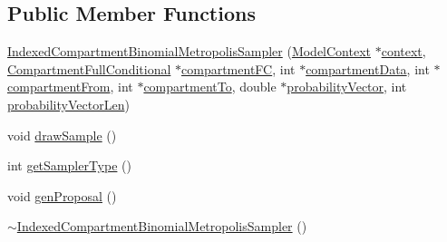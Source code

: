 \subsection*{Public Member Functions}
\begin{DoxyCompactItemize}
\item 
\hyperlink{classSpatialSEIR_1_1IndexedCompartmentBinomialMetropolisSampler_ae6a8ff175ccc0a96d935b40dae644f76}{Indexed\-Compartment\-Binomial\-Metropolis\-Sampler} (\hyperlink{classSpatialSEIR_1_1ModelContext}{Model\-Context} $\ast$\hyperlink{classSpatialSEIR_1_1IndexedCompartmentBinomialMetropolisSampler_afcc687d3efa75c24937e4bc809928268}{context}, \hyperlink{classSpatialSEIR_1_1CompartmentFullConditional}{Compartment\-Full\-Conditional} $\ast$\hyperlink{classSpatialSEIR_1_1IndexedCompartmentBinomialMetropolisSampler_ab0db99c76bbf5ffdc939771362a872f7}{compartment\-F\-C}, int $\ast$\hyperlink{classSpatialSEIR_1_1IndexedCompartmentBinomialMetropolisSampler_accf1b0fb600a417c513fea3a3d65ea5d}{compartment\-Data}, int $\ast$\hyperlink{classSpatialSEIR_1_1IndexedCompartmentBinomialMetropolisSampler_a915bf551d29852056a3638b00e9a9404}{compartment\-From}, int $\ast$\hyperlink{classSpatialSEIR_1_1IndexedCompartmentBinomialMetropolisSampler_a97302172c15506865073ef44548ce6b0}{compartment\-To}, double $\ast$\hyperlink{classSpatialSEIR_1_1IndexedCompartmentBinomialMetropolisSampler_a1c9a06458af46193bf5a1a55b7652d4d}{probability\-Vector}, int \hyperlink{classSpatialSEIR_1_1IndexedCompartmentBinomialMetropolisSampler_af27c6ad0b6dec9387e298751dea30504}{probability\-Vector\-Len})
\item 
void \hyperlink{classSpatialSEIR_1_1IndexedCompartmentBinomialMetropolisSampler_a3f172aba5d9389b2193200a811d12142}{draw\-Sample} ()
\item 
int \hyperlink{classSpatialSEIR_1_1IndexedCompartmentBinomialMetropolisSampler_a2ce0af7bb2a881f254dfbd97584704bd}{get\-Sampler\-Type} ()
\item 
void \hyperlink{classSpatialSEIR_1_1IndexedCompartmentBinomialMetropolisSampler_af764b1c587bf46ef2198250bea987ace}{gen\-Proposal} ()
\item 
\hyperlink{classSpatialSEIR_1_1IndexedCompartmentBinomialMetropolisSampler_a34c4b58ae9a7550ce48f54a8c4c3ca6d}{$\sim$\-Indexed\-Compartment\-Binomial\-Metropolis\-Sampler} ()
\end{DoxyCompactItemize}
